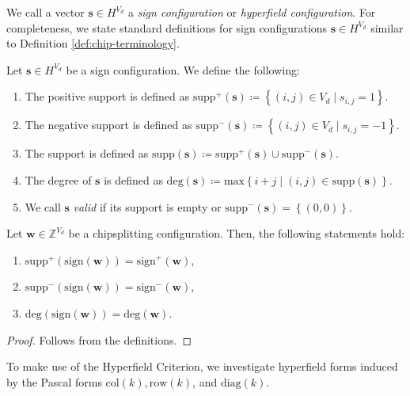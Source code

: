 We call a vector \( \mathbf{s} \in H^{V_d} \) a \emph{sign configuration} or \emph{hyperfield configuration}. For completeness, we state standard definitions for sign configurations \( \mathbf{s} \in H^{V_d} \) similar to Definition \ref{def:chip-terminology}.

\begin{definition}
    Let \( \mathbf{s} \in H^{V_d} \) be a sign configuration. We define the following:
    \begin{enumerate}
        \item The positive support is defined as \( \mathrm{supp}^+(\mathbf{s}) \coloneqq \left\{ (i,j) \in V_d \mid s_{i,j} = 1 \right\} \).
        \item The negative support is defined as \( \mathrm{supp}^-(\mathbf{s}) \coloneqq \left\{ (i,j) \in V_d \mid s_{i,j} = -1 \right\} \).
        \item The support is defined as \( \mathrm{supp}(\mathbf{s}) \coloneqq \mathrm{supp}^+(\mathbf{s}) \cup \mathrm{supp}^-(\mathbf{s}) \).
        \item The degree of \( \mathbf{s} \) is defined as \( \mathrm{deg}(\mathbf{s}) \coloneqq \mathrm{max}\left\{ i + j \mid (i,j) \in \mathrm{supp}(\mathbf{s}) \right\} \).
        \item We call \( \mathbf{s} \) \emph{valid} if its support is empty or \( \mathrm{supp}^-(\mathbf{s}) = \left\{ (0,0) \right\} \).
    \end{enumerate}
\end{definition}

\begin{lemma}
    Let \( \mathbf{w} \in \mathbb{Z}^{V_d} \) be a chipsplitting configuration. Then, the following statements hold:
    \begin{enumerate}
        \item \( \mathrm{supp}^+(\mathrm{sign}(\mathbf{w})) = \mathrm{sign}^+(\mathbf{w}) \),
        \item \( \mathrm{supp}^-(\mathrm{sign}(\mathbf{w})) = \mathrm{sign}^-(\mathbf{w}) \),
        \item \( \mathrm{deg}(\mathrm{sign}(\mathbf{w})) = \mathrm{deg}(\mathbf{w}) \).
    \end{enumerate}
\end{lemma}

\begin{proof}
    Follows from the definitions.
\end{proof}

To make use of the Hyperfield Criterion, we investigate hyperfield forms induced by the Pascal forms \( \mathrm{col}(k), \mathrm{row}(k) \), and \( \mathrm{diag}(k) \).

